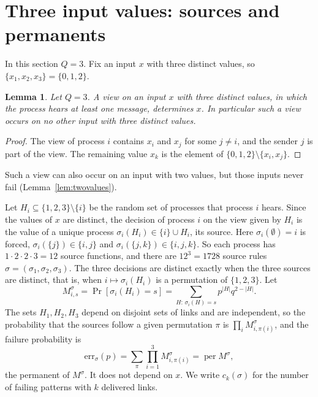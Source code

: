 \documentclass[11pt]{article}
\newtheorem{lemma}[theorem]{Lemma}
\theoremstyle{remark}
\begin{document}
\section{Three input values: sources and permanents}\label{sec:sources}

In this section $Q=3$. Fix an input $x$ with three distinct values, so $\{x_1,x_2,x_3\}=\{0,1,2\}$.

\begin{lemma}\label{lem:decouple}
Let $Q=3$. A view on an input $x$ with three distinct values, in which the process hears at least one message, determines $x$. In particular such a view occurs on no other input with three distinct values.
\end{lemma}

\begin{proof}
The view of process $i$ contains $x_i$ and $x_j$ for some $j\ne i$, and the sender $j$ is part of the view. The remaining value $x_k$ is the element of $\{0,1,2\}\setminus\{x_i,x_j\}$.
\end{proof}

Such a view can also occur on an input with two values, but those inputs never fail (Lemma~\ref{lem:twovalues}).

Let $H_i\subseteq\{1,2,3\}\setminus\{i\}$ be the random set of processes that process $i$ hears. Since the values of $x$ are distinct, the decision of process $i$ on the view given by $H_i$ is the value of a unique process $\sigma_i(H_i)\in\{i\}\cup H_i$, its source. Here $\sigma_i(\emptyset)=i$ is forced, $\sigma_i(\{j\})\in\{i,j\}$ and $\sigma_i(\{j,k\})\in\{i,j,k\}$. So each process has $1\cdot2\cdot2\cdot3=12$ source functions, and there are $12^3=1728$ source rules $\sigma=(\sigma_1,\sigma_2,\sigma_3)$. The three decisions are distinct exactly when the three sources are distinct, that is, when $i\mapsto\sigma_i(H_i)$ is a permutation of $\{1,2,3\}$. Let
\[
M^\sigma_{i,s}=\Pr[\sigma_i(H_i)=s]=\sum_{H:\,\sigma_i(H)=s}p^{|H|}q^{2-|H|}.
\]
The sets $H_1,H_2,H_3$ depend on disjoint sets of links and are independent, so the probability that the sources follow a given permutation $\pi$ is $\prod_i M^\sigma_{i,\pi(i)}$, and the failure probability is
\begin{equation}\label{eq:perm}
\mathrm{err}_\sigma(p)=\sum_{\pi}\prod_{i=1}^3 M^\sigma_{i,\pi(i)}=\operatorname{per}M^\sigma,
\end{equation}
the permanent of $M^\sigma$. It does not depend on $x$. We write $c_k(\sigma)$ for the number of failing patterns with $k$ delivered links.
\end{document}
